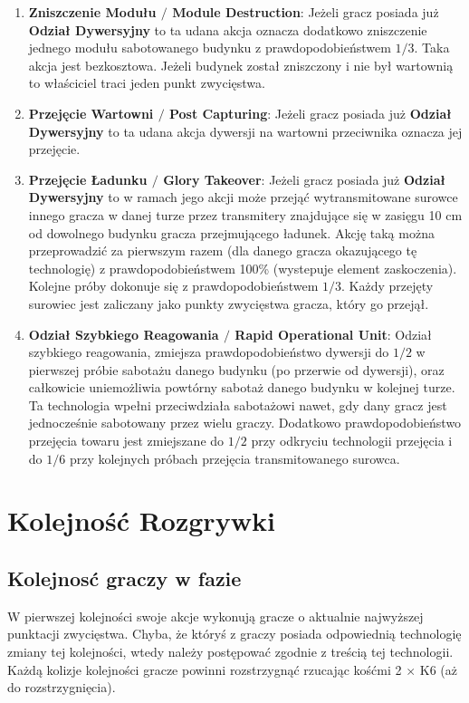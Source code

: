 \documentclass[11pt,a4paper]{article}
\begin{document}
\begin{enumerate}
\item \textbf{Zniszczenie Modułu $/$ Module Destruction}: Jeżeli gracz posiada już \textbf{Odział Dywersyjny} to ta udana akcja oznacza dodatkowo zniszczenie jednego modułu sabotowanego budynku z prawdopodobieństwem $1/3$. Taka akcja jest bezkosztowa. Jeżeli budynek został zniszczony i nie był wartownią to właściciel traci jeden punkt zwycięstwa.
\item \textbf{Przejęcie Wartowni $/$ Post Capturing}: Jeżeli gracz posiada już \textbf{Odział Dywersyjny} to ta udana akcja dywersji na wartowni przeciwnika oznacza jej przejęcie.
\item \textbf{Przejęcie Ładunku $/$ Glory Takeover}: Jeżeli gracz posiada już \textbf{Odział Dywersyjny} to w ramach jego akcji może przejąć wytransmitowane surowce innego gracza w danej turze przez transmitery znajdujące się w zasięgu 10 cm od dowolnego budynku gracza przejmującego ładunek. Akcję taką można przeprowadzić za pierwszym razem (dla danego gracza okazującego tę technologię) z prawdopodobieństwem 100\% (wystepuje element zaskoczenia). Kolejne próby dokonuje się z prawdopodobieństwem $1/3$. Każdy przejęty surowiec jest zaliczany jako punkty zwycięstwa gracza, który go przejął. 
\item \textbf{Odział Szybkiego Reagowania $/$ Rapid Operational Unit}: Odział szybkiego reagowania, zmiejsza prawdopodobieństwo dywersji do $1/2$ w pierwszej próbie sabotażu danego budynku (po przerwie od dywersji), oraz całkowicie uniemożliwia powtórny sabotaż danego budynku w kolejnej turze. Ta technologia wpełni przeciwdziała sabotażowi nawet, gdy dany gracz jest jednocześnie sabotowany przez wielu graczy. Dodatkowo prawdopodobieństwo przejęcia towaru jest zmiejszane do $1/2$ przy odkryciu technologii przejęcia i do $1/6$ przy kolejnych próbach przejęcia transmitowanego surowca.
\end{enumerate}

\section{Kolejność Rozgrywki}

\subsection{Kolejnosć graczy w fazie}

W pierwszej kolejności swoje akcje wykonują gracze o aktualnie najwyższej punktacji zwycięstwa. Chyba, że któryś z graczy posiada odpowiednią technologię zmiany tej kolejności, wtedy należy postępować zgodnie z treścią tej technologii. Każdą kolizje kolejności gracze powinni rozstrzygnąć rzucając kośćmi 2 $\times$ K6 (aż do rozstrzygnięcia).
\end{document}
